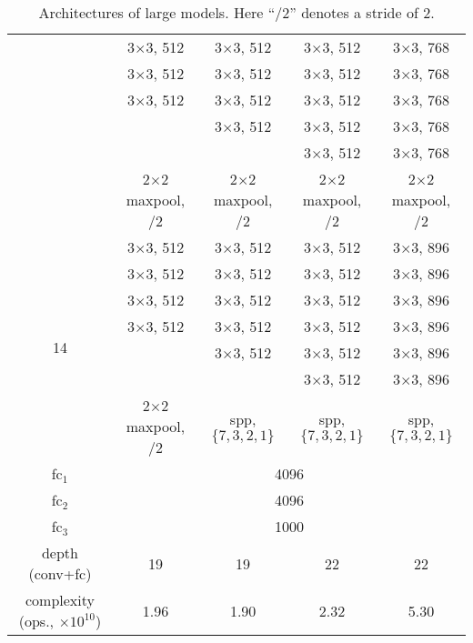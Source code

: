 \documentclass[10pt,twocolumn,letterpaper]{article}
\renewcommand\arraystretch{1.1}
\begin{document}
\begin{table*}[t]
\begin{center}
\begin{tabular}{|c||c||c|c|c|}
                    &  3$\times$3, 512 &  3$\times$3, 512 &  3$\times$3, 512  &  3$\times$3, 768\\
                    &  3$\times$3, 512 &  3$\times$3, 512 &  3$\times$3, 512  &  3$\times$3, 768\\
                    &  3$\times$3, 512 &  3$\times$3, 512 &  3$\times$3, 512  &  3$\times$3, 768\\
                    &                  &  3$\times$3, 512 &  3$\times$3, 512  &  3$\times$3, 768\\
                    &                  &                  &  3$\times$3, 512  &  3$\times$3, 768\\
                    &  2$\times$2 maxpool, /2 & 2$\times$2 maxpool, /2 & 2$\times$2 maxpool, /2 & 2$\times$2 maxpool, /2\\
\hline
\multirow{7}{*}{14} &  3$\times$3, 512 &  3$\times$3, 512 &  3$\times$3, 512  &  3$\times$3, 896\\
                    &  3$\times$3, 512 &  3$\times$3, 512 &  3$\times$3, 512  &  3$\times$3, 896\\
                    &  3$\times$3, 512 &  3$\times$3, 512 &  3$\times$3, 512  &  3$\times$3, 896\\
                    &  3$\times$3, 512 &  3$\times$3, 512 &  3$\times$3, 512  &  3$\times$3, 896\\
                    &                  &  3$\times$3, 512 &  3$\times$3, 512  &  3$\times$3, 896\\
                    &                  &                  &  3$\times$3, 512  &  3$\times$3, 896\\
                    &  2$\times$2 maxpool, /2   &  spp, $\{7,3,2,1\}$ & spp, $\{7,3,2,1\}$ & spp, $\{7,3,2,1\}$ \\
\hline
fc$_{1}$ &  \multicolumn{4}{c|}{4096} \\
fc$_{2}$ &  \multicolumn{4}{c|}{4096} \\
fc$_{3}$ &  \multicolumn{4}{c|}{1000} \\
\hline
depth (conv+fc) & 19 & 19 & 22 & 22\\
\hline
complexity (ops., $\times 10^{10}$)     & 1.96 & 1.90 & 2.32 & 5.30\\
\hline
\end{tabular}
\end{center}
\caption{Architectures of large models. Here ``/2'' denotes a stride of 2.}
\label{tab:arch}
\end{table*}
\renewcommand\arraystretch{1.1}
\end{document}
